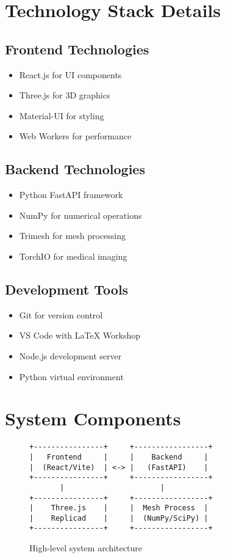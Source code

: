 \section{Technology Stack Details}
\subsection{Frontend Technologies}
\begin{itemize}
    \item React.js for UI components
    \item Three.js for 3D graphics
    \item Material-UI for styling
    \item Web Workers for performance
\end{itemize}

\subsection{Backend Technologies}
\begin{itemize}
    \item Python FastAPI framework
    \item NumPy for numerical operations
    \item Trimesh for mesh processing
    \item TorchIO for medical imaging
\end{itemize}

\subsection{Development Tools}
\begin{itemize}
    \item Git for version control
    \item VS Code with LaTeX Workshop
    \item Node.js development server
    \item Python virtual environment
\end{itemize}

\section{System Components}
\begin{figure}[h]
\centering
\begin{tcolorbox}[width=0.8\textwidth]
\begin{verbatim}
+----------------+     +-----------------+
|   Frontend     |     |    Backend     |
|  (React/Vite)  | <-> |   (FastAPI)    |
+----------------+     +-----------------+
       |                      |
+----------------+     +-----------------+
|    Three.js    |     |  Mesh Process  |
|    Replicad    |     |  (NumPy/SciPy) |
+----------------+     +-----------------+
\end{verbatim}
\end{tcolorbox}
\caption{High-level system architecture}
\end{figure}

